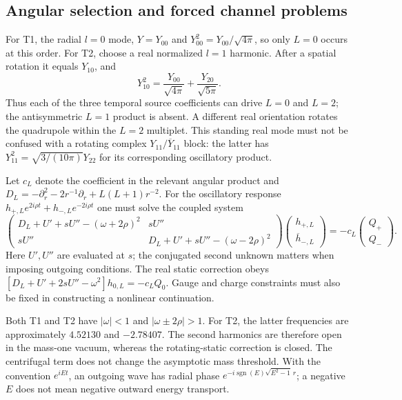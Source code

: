 \subsection{Angular selection and forced channel problems}
\label{nl:selection}
For T1, the radial $l=0$ mode, $Y=Y_{00}$ and
$Y_{00}^2=Y_{00}/\sqrt{4\pi}$, so only $L=0$ occurs at this order.
For T2, choose a real normalized $l=1$ harmonic. After a spatial rotation
it equals $Y_{10}$, and
\begin{equation}
 Y_{10}^2=\frac{Y_{00}}{\sqrt{4\pi}}
          +\frac{Y_{20}}{\sqrt{5\pi}}.
 \label{nl:angular}
\end{equation}
Thus each of the three temporal source coefficients can drive $L=0$
and $L=2$; the antisymmetric $L=1$ product is absent. A different real
orientation rotates the quadrupole within the $L=2$ multiplet. This
standing real mode must not be confused with a rotating complex
$Y_{11}/\overline{Y}_{11}$ block: the latter has
$Y_{11}^2=\sqrt{3/(10\pi)}Y_{22}$ for its corresponding oscillatory product.

Let $c_L$ denote the coefficient in the relevant angular product and
$D_L=-\partial_r^2-2r^{-1}\partial_r+L(L+1)r^{-2}$. For the oscillatory
response $h_{+,L}e^{2i\rho t}+h_{-,L}e^{-2i\rho t}$ one must solve
the coupled system
\begin{equation}
 \begin{pmatrix}
 D_L+U'+sU''-(\omega+2\rho)^2&sU''\\
 sU''&D_L+U'+sU''-(\omega-2\rho)^2
 \end{pmatrix}
 \begin{pmatrix}h_{+,L}\\\overline{h}_{-,L}\end{pmatrix}
 =-c_L\begin{pmatrix}Q_+\\Q_-\end{pmatrix}.
 \label{nl:forced}
\end{equation}
Here $U',U''$ are evaluated at $s$; the conjugated second unknown matters
when imposing outgoing conditions. The real static correction obeys
$[D_L+U'+2sU''-\omega^2]h_{0,L}=-c_LQ_0$.
Gauge and charge constraints must also be fixed in constructing a
nonlinear continuation.

Both T1 and T2 have $|\omega|<1$ and $|\omega\pm2\rho|>1$.
For T2, the latter frequencies are approximately $4.52130$ and $-2.78407$.
The second harmonics are therefore open in the mass-one vacuum, whereas
the rotating-static correction is closed. The centrifugal term does
not change the asymptotic mass threshold. With the convention
$e^{iEt}$, an outgoing wave has radial phase
$e^{-i\operatorname{sgn}(E)\sqrt{E^2-1}\,r}$; a negative $E$ does not
mean negative outward energy transport.

